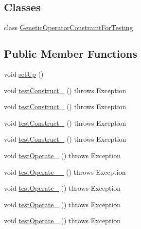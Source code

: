 \subsection*{Classes}
\begin{DoxyCompactItemize}
\item 
class \hyperlink{classorg_1_1jgap_1_1impl_1_1_mutation_operator_test_1_1_genetic_operator_constraint_for_testing}{Genetic\-Operator\-Constraint\-For\-Testing}
\end{DoxyCompactItemize}
\subsection*{Public Member Functions}
\begin{DoxyCompactItemize}
\item 
void \hyperlink{classorg_1_1jgap_1_1impl_1_1_mutation_operator_test_a145e4d335c30a98e2a4defa2f2d671f5}{set\-Up} ()
\item 
void \hyperlink{classorg_1_1jgap_1_1impl_1_1_mutation_operator_test_a89343855ff3e8551f8c6e7d8e5188f61}{test\-Construct\-\_} ()  throws Exception 
\item 
void \hyperlink{classorg_1_1jgap_1_1impl_1_1_mutation_operator_test_abb1385a3b221e523f24a0248338ff6ca}{test\-Construct\-\_} ()  throws Exception 
\item 
void \hyperlink{classorg_1_1jgap_1_1impl_1_1_mutation_operator_test_a5a765f7c4640bd4e9ddb7a2603659755}{test\-Construct\-\_} ()  throws Exception 
\item 
void \hyperlink{classorg_1_1jgap_1_1impl_1_1_mutation_operator_test_a4df357edd3c12138a9313ae89e13fad5}{test\-Construct\-\_} ()  throws Exception 
\item 
void \hyperlink{classorg_1_1jgap_1_1impl_1_1_mutation_operator_test_a75ad69b96c38a60df331d44f078aa349}{test\-Operate\-\_} ()  throws Exception 
\item 
void \hyperlink{classorg_1_1jgap_1_1impl_1_1_mutation_operator_test_a0e7839c7b250cbc8cde95942b617a825}{test\-Operate\-\_\-\_} ()  throws Exception 
\item 
void \hyperlink{classorg_1_1jgap_1_1impl_1_1_mutation_operator_test_af9002f5f4f3c535f831a336a8c9b7283}{test\-Operate\-\_} ()  throws Exception 
\item 
void \hyperlink{classorg_1_1jgap_1_1impl_1_1_mutation_operator_test_ae766b72f99d4943182866cd61820fd23}{test\-Operate\-\_} ()  throws Exception 
\item 
void \hyperlink{classorg_1_1jgap_1_1impl_1_1_mutation_operator_test_aef98b4c2a05ec38611ed3ee027655ebe}{test\-Operate\-\_} ()  throws Exception 

\end{DoxyCompactItemize}
